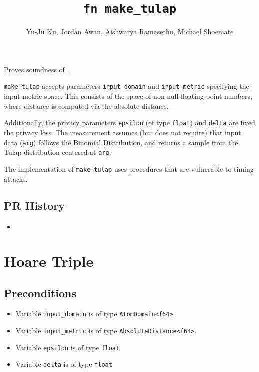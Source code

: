 \documentclass{article}
\title{\texttt{fn make\_tulap}}
\author{Yu-Ju Ku, Jordan Awan, Aishwarya Ramasethu, Michael Shoemate}
\begin{document}
\maketitle

\contrib

Proves soundness of .

\texttt{make\_tulap} accepts parameters \texttt{input\_domain} and \texttt{input\_metric} specifying the input metric space.
This consists of the space of non-null floating-point numbers, where distance is computed via the absolute distance.

Additionally, the privacy parameters \texttt{epsilon} (of type \texttt{float}) and \texttt{delta} are fixed the privacy loss.
The measurement assumes (but does not require) that input data (\texttt{arg}) follows the Binomial Distribution,
and returns a sample from the Tulap distribution centered at \texttt{arg}.

\begin{tcolorbox}
    \begin{warning}
        The implementation of \texttt{make\_tulap} uses procedures that are vulnerable to timing attacks. 
    \end{warning}
\end{tcolorbox}

\subsection*{PR History}
\begin{itemize}
    \item {}
\end{itemize}

\section{Hoare Triple}

\subsection*{Preconditions}
\begin{itemize}
    \item Variable \texttt{input\_domain} is of type \texttt{AtomDomain<f64>}.
    \item Variable \texttt{input\_metric} is of type \texttt{AbsoluteDistance<f64>}.
    \item Variable \texttt{epsilon} is of type \texttt{float}
    \item Variable \texttt{delta} is of type \texttt{float}
\end{itemize}
\end{document}
